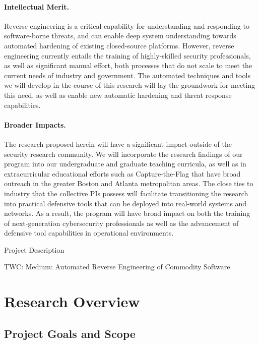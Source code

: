 \documentclass[letterpaper,twoside,11pt,headings=small]{scrartcl}
\newcommand{\basetitle}{TWC: Medium: Automated Reverse Engineering of Commodity Software}
\newcommand{\thetitle}{\basetitle\xspace}
\begin{document}
\paragraph{Intellectual Merit.} Reverse engineering is a critical capability
for understanding and responding to software-borne threats, and can enable
deep system understanding towards automated hardening of existing
closed-source platforms.  However, reverse engineering currently entails the training
of highly-skilled security professionals, as well as significant manual
effort, both processes that do not scale to meet the current needs of industry
and government.  The automated techniques and tools we will develop in the
course of this research will lay the groundwork for meeting this need, as well
as enable new automatic hardening and threat response capabilities.

\paragraph{Broader Impacts.} The research proposed herein will have a
significant impact outside of the security research community.  We will
incorporate the research findings of our program into our undergraduate and
graduate teaching curricula, as well as in extracurricular educational efforts
such as Capture-the-Flag that have broad outreach in the greater Boston and
Atlanta metropolitan areas.  The close ties to industry that the collective
PIs possess will facilitate transitioning the research into practical
defensive tools that can be deployed into real-world systems and networks. As
a result, the program will have broad impact on both the training of
next-generation cybersecurity professionals as well as the advancement of
defensive tool capabilities in operational environments.

\newpage
{}
\setcounter{page}{1}

{\sffamily\bfseries
\begin{center}
\fontsize{16}{16}\selectfont Project Description

\fontsize{13}{13}\selectfont \thetitle
\end{center}
}

\section{Research Overview}
\label{sec:overview}

\subsection{Project Goals and Scope}
\label{sec:overview:goals}
\end{document}
